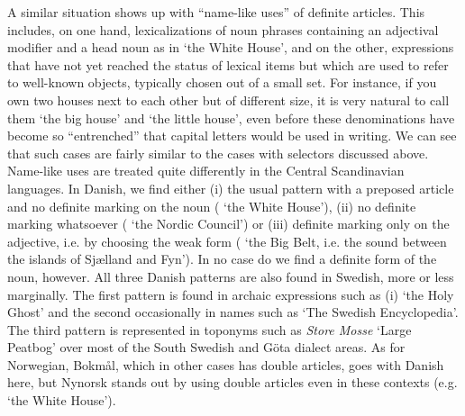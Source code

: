 A similar situation shows up with “name-like uses” of definite articles. This includes, on one hand, lexicalizations of noun phrases containing an adjectival modifier and a head noun as in  ‘the White House’, and on the other, expressions that have not yet reached the status of lexical items but which are used to refer to well-known objects, typically chosen out of a small set. For instance, if you own two houses next to each other but of different size, it is very natural to call them  ‘the big house’ and  ‘the little house’, even before these denominations have become so “entrenched” that capital letters would be used in writing. We can see that such cases are fairly similar to the cases with selectors discussed above. Name-like uses are treated quite differently in the Central Scandinavian languages. In Danish, we find either (i) the usual pattern with a preposed article and no definite marking on the noun ( ‘the White House’), (ii) no definite marking whatsoever ( ‘the Nordic Council’) or (iii) definite marking only on the adjective, i.e. by choosing the weak form ( ‘the Big Belt, i.e. the sound between the islands of Sjælland and Fyn’). In no case do we find a definite form of the noun, however. All three Danish patterns are also found in Swedish, more or less marginally. The first pattern is found in archaic expressions such as (i)  ‘the Holy Ghost’ and the second occasionally in names such as   ‘The Swedish Encyclopedia’. The third pattern is represented in toponyms such as \textit{Store Mosse} ‘Large Peatbog’ over most of the South Swedish and Göta dialect areas. As for Norwegian, Bokmål, which in other cases has double articles, goes with Danish here, but Nynorsk stands out by using double articles even in these contexts (e.g.  ‘the White House’). 

